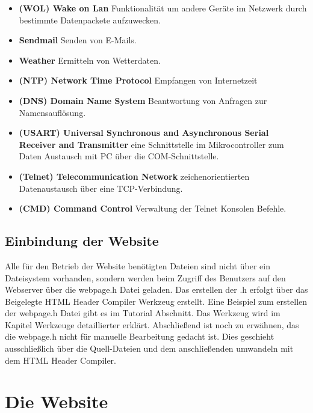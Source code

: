 \begin{itemize}
  \item \textbf{(WOL) Wake on Lan} Funktionalität um andere Geräte im Netzwerk
  durch bestimmte Datenpackete aufzuwecken.
  \item \textbf{Sendmail} Senden von E-Mails.
  \item \textbf{Weather} Ermitteln von Wetterdaten.
  \item \textbf{(NTP) Network Time Protocol} Empfangen von Internetzeit
  \item \textbf{(DNS) Domain Name System} Beantwortung von Anfragen zur
  Namensauflösung.
  \item \textbf{(USART) Universal Synchronous and Asynchronous Serial Receiver and
  Transmitter} eine Schnittstelle im Mikrocontroller zum Daten
  Austausch mit PC über die COM-Schnittstelle.
  \item \textbf{(Telnet) Telecommunication Network} zeichenorientierten
  Datenaustausch über eine TCP-Verbindung.
  \item \textbf{(CMD) Command Control} Verwaltung der Telnet Konsolen Befehle.
\end{itemize}

\subsection{Einbindung der Website}

Alle für den Betrieb der Website benötigten Dateien sind nicht über ein
Dateisystem vorhanden, sondern werden beim Zugriff des Benutzers auf den
Webserver über die \textrm{webpage.h} Datei geladen.
Das erstellen der .h erfolgt über das Beigelegte \textrm{HTML Header Compiler}
Werkzeug erstellt. Eine Beispiel zum erstellen der \textrm{webpage.h} Datei gibt
es im Tutorial Abschnitt. Das Werkzeug wird im Kapitel Werkzeuge detaillierter
erklärt. Abschließend ist noch zu erwähnen, das die \textrm{webpage.h} nicht für manuelle
Bearbeitung gedacht ist. Dies geschieht ausschließlich über die Quell-Dateien
und dem anschließenden umwandeln mit dem \textrm{HTML Header Compiler}.

\section{Die Website}
